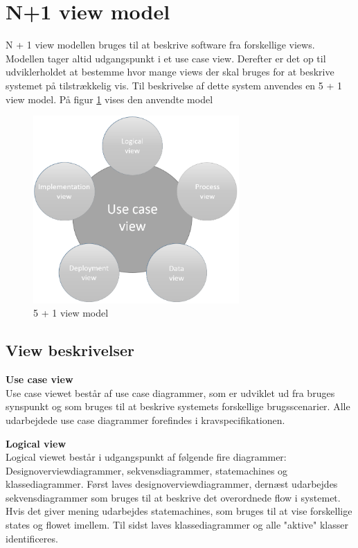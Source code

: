 \section{N+1 view model}

N + 1 view modellen bruges til at beskrive software fra forskellige views. Modellen tager altid udgangspunkt i et use case view. Derefter er det op til udviklerholdet at bestemme hvor mange views der skal bruges for at beskrive systemet på tilstrækkelig vis. Til beskrivelse af dette system anvendes en 5 + 1 view model. På figur \ref{fig:5 + 1 view model} vises den anvendte model


\vspace{-5pt}
\begin{figure}[H]
	\centering
	\includegraphics[width=0.7\textwidth]{Billeder/n+1}
	\vspace{0cm}
	\caption{5 + 1 view model}
	\label{fig:5 + 1 view model}
\end{figure}


\newpage

\subsection{View beskrivelser}

\textbf{Use case view}\\
Use case viewet består af use case diagrammer, som er udviklet ud fra bruges synspunkt og som bruges til at beskrive systemets forskellige brugsscenarier. Alle udarbejdede use case diagrammer forefindes i kravspecifikationen.

\textbf{Logical view}\\
Logical viewet består i udgangspunkt af følgende fire diagrammer: Designoverviewdiagrammer, sekvensdiagrammer, statemachines og klassediagrammer. Først laves designoverviewdiagrammer, dernæst udarbejdes sekvensdiagrammer som bruges til at beskrive det overordnede flow i systemet. Hvis det giver mening udarbejdes statemachines, som bruges til at vise forskellige states og flowet imellem. Til sidst laves klassediagrammer og alle "aktive" klasser identificeres. 

